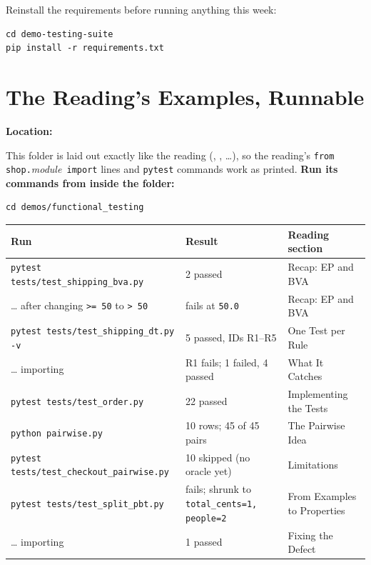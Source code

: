 \documentclass[11pt]{article}
\begin{document}
\begin{tipbox}
Reinstall the requirements before running anything this week:
\begin{lstlisting}[style=shellstyle]
cd demo-testing-suite
pip install -r requirements.txt
\end{lstlisting}
\end{tipbox}

\section{The Reading's Examples, Runnable}
\textbf{Location:} 

This folder is laid out exactly like the reading
(, , \ldots), so the
reading's \texttt{from shop.}\textit{module}\texttt{ import} lines and \texttt{pytest}
commands work as printed. \textbf{Run its commands from inside the
folder:}
\begin{lstlisting}[style=shellstyle]
cd demos/functional_testing
\end{lstlisting}

\begin{center}
\footnotesize
\begin{tabular}{@{}L{5.6cm}L{4.4cm}L{4.6cm}@{}}
\toprule
\textbf{Run} & \textbf{Result} & \textbf{Reading section} \\
\midrule
\texttt{pytest tests/test\_shipping\_bva.py} & 2 passed & Recap: EP and
BVA \\
\ldots{} after changing \texttt{>=~50} to \texttt{>~50} & fails at
\texttt{50.0} & Recap: EP and BVA \\
\texttt{pytest tests/test\_shipping\_dt.py -v} & 5 passed, IDs R1--R5 &
One Test per Rule \\
\ldots{} importing  & R1 fails; 1 failed, 4
passed & What It Catches \\
\texttt{pytest tests/test\_order.py} & 22 passed & Implementing the
Tests \\
\texttt{python pairwise.py} & 10 rows; 45 of 45 pairs & The Pairwise
Idea \\
\texttt{pytest tests/test\_checkout\_pairwise.py} & 10 skipped (no
oracle yet) & Limitations \\
\texttt{pytest tests/test\_split\_pbt.py} & fails; shrunk to
\texttt{total\_cents=1, people=2} & From Examples to Properties \\
\ldots{} importing  & 1 passed & Fixing the
Defect \\
\bottomrule
\end{tabular}
\end{center}
\end{document}

